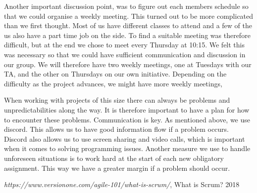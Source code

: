 \documentclass{article}
\begin{document}
Another important discussion point, was to figure out each members schedule so that we could organise a weekly meeting. This turned out to be more complicated than we first thought. Most of us have different classes to attend and a few of the us also have a part time job on the side. To find a suitable meeting was therefore  difficult, but at the end we chose to meet every Thursday at 10:15. We felt this was necessary so that we could have sufficient communication and discussion in our group. We will therefore have two weekly meetings, one at Tuesdays with our TA, and the other on Thursdays on our own initiative. Depending on the difficulty as the project advances, we might have more weekly meetings,  \newline

When working with projects of this size there can always be problems and unpredictabilities along the way. It is therefore important to have a plan for how to encounter these problems. Communication is key. As mentioned above, we use discord. This allows us to have good information flow if a problem occurs. Discord also allows us to use screen sharing and video calls, which is important when it comes to solving programming issues. Another measure we use to handle unforeseen situations is to work hard at the start of each new obligatory assignment. This way we have a greater margin if a problem should occur. 
\newline


\begin{thebibliography}{9}
 
  \textit{https://www.versionone.com/agile-101/what-is-scrum/},
  What is Scrum?
  2018
  

\end{thebibliography}
\end{document}
